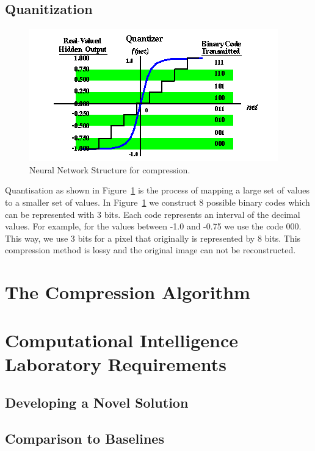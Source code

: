 \documentclass[10pt,conference,compsocconf]{IEEEtran}
\begin{document}
\subsection{Quanitization}
\begin{figure}[tbp]
  \centering
  \includegraphics[width=\columnwidth]{bpQuantizer}
  \caption{Neural Network Structure for compression.}
  \label{fig:bpQuantizer}
\end{figure}

Quantisation as shown in Figure~\ref{fig:bpQuantizer} is the process of mapping a large set of values to a smaller set of values. In Figure~\ref{fig:bpQuantizer} we construct 8 possible binary codes which can be represented with 3 bits. Each code represents an interval of the decimal values. For example, for the values between -1.0 and -0.75 we use the code 000. This way, we use 3 bits for a pixel that originally is represented by 8 bits. This compression method is lossy and the original image can not be reconstructed. 

\section{The Compression Algorithm}
\label{sec:compAlg}



\section{Computational Intelligence Laboratory Requirements}
\label{sec:cil}
\subsection{Developing a Novel Solution}

\subsection{Comparison to Baselines}
\end{document}
